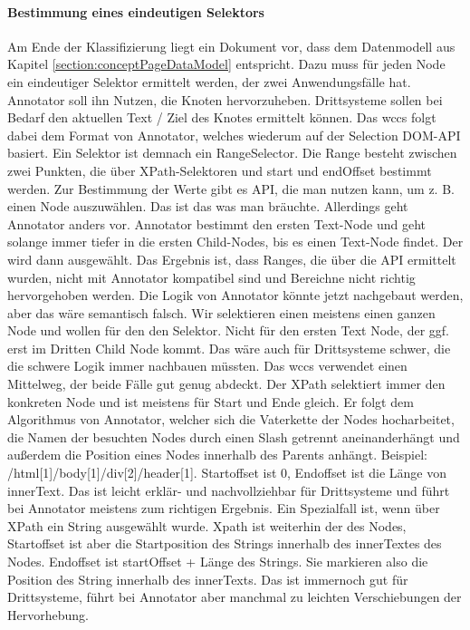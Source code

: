     \paragraph{Bestimmung eines eindeutigen Selektors}
    Am Ende der Klassifizierung liegt ein Dokument vor, dass dem Datenmodell aus Kapitel \ref{section:conceptPageDataModel} entspricht.
    Dazu muss für jeden Node ein eindeutiger Selektor ermittelt werden,
    der zwei Anwendungsfälle hat.
    Annotator soll ihn Nutzen, die Knoten hervorzuheben.
    Drittsysteme sollen bei Bedarf den aktuellen Text / Ziel des Knotes ermittelt können.
    Das \gls{wccs} folgt dabei dem Format von Annotator, welches wiederum auf der Selection DOM-API basiert.
    Ein Selektor ist demnach ein RangeSelector.
    Die Range besteht zwischen zwei Punkten,
    die über XPath-Selektoren und start und endOffset bestimmt werden.
    Zur Bestimmung der Werte gibt es API, die man nutzen kann, um z. B. einen Node auszuwählen.
    Das ist das was man bräuchte.
    Allerdings geht Annotator anders vor.
    Annotator bestimmt den ersten Text-Node und geht solange immer tiefer
    in die ersten Child-Nodes, bis es einen Text-Node findet.
    Der wird dann ausgewählt.
    Das Ergebnis ist, dass Ranges, die über die API ermittelt wurden,
    nicht mit Annotator kompatibel sind und Bereichne nicht richtig hervorgehoben werden.
    Die Logik von Annotator könnte jetzt nachgebaut werden, aber das wäre semantisch falsch.
    Wir selektieren einen meistens einen ganzen Node und wollen für den den Selektor.
    Nicht für den ersten Text Node, der ggf. erst im Dritten Child Node kommt.
    Das wäre auch für Drittsysteme schwer, die die schwere Logik immer nachbauen müssten.
    Das \gls{wccs} verwendet einen Mittelweg, der beide Fälle gut genug abdeckt.
    Der XPath selektiert immer den konkreten Node und ist meistens für Start und Ende gleich.
    Er folgt dem Algorithmus von Annotator, welcher sich die Vaterkette der Nodes hocharbeitet,
    die Namen der besuchten Nodes durch einen Slash getrennt aneinanderhängt
    und außerdem die Position eines Nodes innerhalb des Parents anhängt.
    Beispiel: /html[1]/body[1]/div[2]/header[1].
    Startoffset ist 0, Endoffset ist die Länge von innerText.
    Das ist leicht erklär- und nachvollziehbar für Drittsysteme und führt bei Annotator meistens zum richtigen Ergebnis.
    Ein Spezialfall ist, wenn über XPath ein String ausgewählt wurde.
    Xpath ist weiterhin der des Nodes, Startoffset ist aber die Startposition des Strings innerhalb des innerTextes des Nodes.
    Endoffset ist startOffset + Länge des Strings.
    Sie markieren also die Position des String innerhalb des innerTexts.
    Das ist immernoch gut für Drittsysteme, führt bei Annotator aber manchmal zu leichten Verschiebungen der Hervorhebung.

